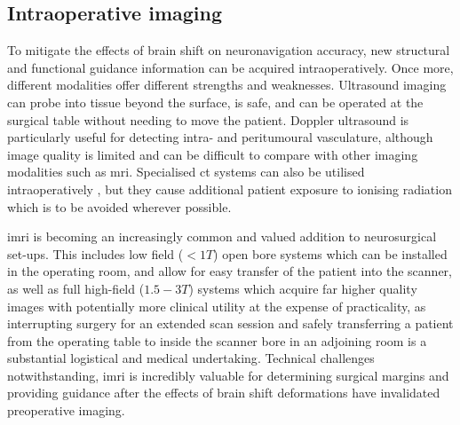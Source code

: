 
\subsection{Intraoperative imaging}

To mitigate the effects of brain shift on neuronavigation accuracy, new structural and functional guidance information can be acquired intraoperatively.
Once more, different modalities offer different strengths and weaknesses.
Ultrasound imaging can probe into tissue beyond the surface, is safe, and can be operated at the surgical table without needing to move the patient\autocite{Elmesallamy2019,Eljamel2016}.
Doppler ultrasound is particularly useful for detecting intra- and peritumoural vasculature\autocite{Steno2016}, although image quality is limited and can be difficult to compare with other imaging modalities such as \gls{mri}\autocite{Eljamel2016}.
Specialised \gls{ct} systems can also be utilised intraoperatively \autocite{Bayer2018}, but they cause additional patient exposure to ionising radiation which is to be avoided wherever possible.

\Gls{imri} is becoming an increasingly common and valued addition to neurosurgical set-ups.
This includes low field ($<1T$) open bore systems which can be installed in the operating room, and allow for easy transfer of the patient into the scanner\autocite{Steinmeier1998,Senft2010}, as well as full high-field ($1.5-3T$) systems which acquire far higher quality images with potentially more clinical utility\autocite{Makary2011} at the expense of practicality, as interrupting surgery for an extended scan session and safely transferring a patient from the operating table to inside the scanner bore in an adjoining room is a substantial logistical and medical undertaking\autocite{Senft2010,Giordano2016a,Sattur2019}.
Technical challenges notwithstanding, \gls{imri} is incredibly valuable for determining surgical margins and providing guidance after the effects of brain shift deformations have invalidated preoperative imaging.

